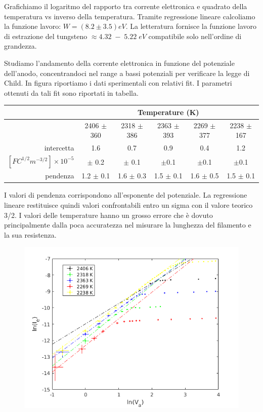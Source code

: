\documentclass[11pt,a4paper]{article}
\begin{document}
Grafichiamo il logaritmo del rapporto tra corrente elettronica e quadrato della temperatura vs inverso della temperatura. Tramite regressione lineare calcoliamo la funzione lavoro: $W = (8.2 \pm 3.5) eV$. La letteratura fornisce la funzione lavoro di estrazione del tungsteno $\approx 4.32 \; - \; 5.22 \; eV$ compatibile solo nell'ordine di grandezza.  

	
Studiamo l'andamento della corrente elettronica in funzione del potenziale dell'anodo, concentrandoci nel range a bassi potenziali per verificare la legge di Child. In figura riportiamo i dati sperimentali con relativi fit. I parametri ottenuti da tali fit sono riportati in tabella.

\begin{center}
\begin{tabular}{|r|c|c|c|c|c|}
\hline

&\multicolumn{5}{|c|}{Temperature (K)}\\ \hline
&2406 $\pm$ 360& 	2318 $\pm$ 386&	2363 $\pm$ 393 &	2269 $\pm$ 377&	2238 $\pm$ 167\\ \hline
intercetta&	1.6&	0.7&	0.9&	0.4&	1.2\\ \hline
$[F C^{1/2} m^{-3/2}] \times 10^{-5}$&	$\pm$ 0.2&	$\pm$ 0.1&	$\pm$0.1&	$\pm$0.1&	$\pm$0.1	  \\ \hline
pendenza&	1.2 $\pm$ 0.1	&	1.6 $\pm$ 0.3&	1.5 $\pm$ 0.1&	1.6 $\pm$ 0.5&	1.5 $\pm$ 0.1\\ \hline 
\end{tabular}
\end{center}

I valori di pendenza corrispondono all'esponente del potenziale. La regressione lineare restituisce quindi valori confrontabili entro un sigma con il valore teorico 3/2. I valori delle temperature hanno un grosso errore che è dovuto principalmente dalla poca accuratezza nel misurare la lunghezza del filamento e la sua resistenza.

\begin{figure}[h]
\includegraphics[width=\textwidth]{child}
\end{figure}
\end{document}

